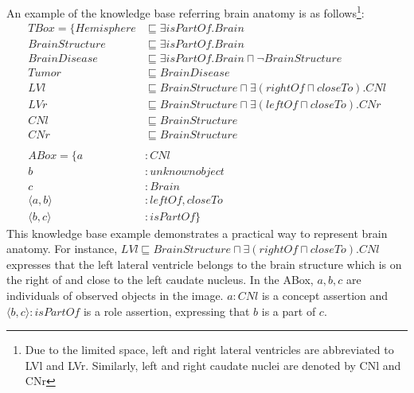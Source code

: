 \documentclass{article}
\begin{document}
An example of the knowledge base referring brain anatomy is as follows\footnote{Due to the limited space, left and right lateral ventricles are abbreviated to LVl and LVr.
Similarly, left and right caudate nuclei are denoted by CNl and CNr}:
\begin{align*}
 TBox=\{ Hemisphere &\sqsubseteq \exists isPartOf. Brain\\
	 BrainStructure &\sqsubseteq \exists isPartOf. Brain\\
	 BrainDisease &\sqsubseteq \exists isPartOf. Brain \sqcap \neg BrainStructure\\
	 Tumor  &\sqsubseteq BrainDisease\\
	 LVl &\sqsubseteq BrainStructure \sqcap \exists (rightOf \sqcap closeTo). CNl\\
	 LVr &\sqsubseteq BrainStructure \sqcap \exists (leftOf \sqcap closeTo). CNr\\
	 CNl &\sqsubseteq BrainStructure\\
	 CNr &\sqsubseteq BrainStructure\\
\\
 ABox=\{ a&: CNl \\
	 b&: unknown object\\
	 c&: Brain \\
	 \langle a,b\rangle &: leftOf, closeTo \\
	 \langle b,c\rangle &: isPartOf\}
\end{align*}
This knowledge base  example demonstrates a practical way to represent brain anatomy. 
For instance, $LVl \sqsubseteq BrainStructure \sqcap \exists (rightOf \sqcap closeTo). CNl$ expresses that
the left lateral ventricle belongs to the brain structure which is on the right of and close to the left caudate nucleus.
In the ABox, $a,b,c$ are individuals of observed objects in the image. $a: CNl$ is a concept assertion and 
$\langle b,c\rangle : isPartOf$ is a role assertion, expressing that $b$ is a part of $c$.
\end{document}
